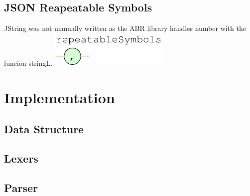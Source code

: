 \documentclass[a4paper]{article}
\begin{document}
\subsection{JSON Reapeatable Symbols}
JString was not manually written as the ABR library handles number with the funcion stringL.
{\centering
   \includegraphics[scale=0.9]{syntax/repeatableSymbols}
}



\section{Implementation}

\subsection{Data Structure}


\subsection{Lexers}


\subsection{Parser}

\end{document}
